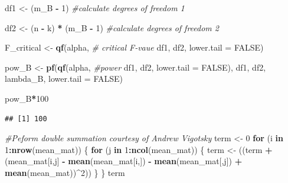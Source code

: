 \documentclass[]{book}
\newenvironment{Shaded}{\begin{snugshade}}{\end{snugshade}}
\newcommand{\CommentTok}[1]{\textcolor[rgb]{0.56,0.35,0.01}{\textit{#1}}}
\newcommand{\ControlFlowTok}[1]{\textcolor[rgb]{0.13,0.29,0.53}{\textbf{#1}}}
\newcommand{\DataTypeTok}[1]{\textcolor[rgb]{0.13,0.29,0.53}{#1}}
\newcommand{\DecValTok}[1]{\textcolor[rgb]{0.00,0.00,0.81}{#1}}
\newcommand{\KeywordTok}[1]{\textcolor[rgb]{0.13,0.29,0.53}{\textbf{#1}}}
\newcommand{\NormalTok}[1]{#1}
\newcommand{\OperatorTok}[1]{\textcolor[rgb]{0.81,0.36,0.00}{\textbf{#1}}}
\newcommand{\OtherTok}[1]{\textcolor[rgb]{0.56,0.35,0.01}{#1}}
\newcommand{\StringTok}[1]{\textcolor[rgb]{0.31,0.60,0.02}{#1}}
\begin{document}
\begin{Shaded}
\begin{Highlighting}[]
\NormalTok{df1 <-}\StringTok{ }\NormalTok{(m_B }\OperatorTok{-}\StringTok{ }\DecValTok{1}\NormalTok{) }\CommentTok{#calculate degrees of freedom 1}

\NormalTok{df2 <-}\StringTok{ }\NormalTok{(n }\OperatorTok{-}\StringTok{ }\NormalTok{k) }\OperatorTok{*}\StringTok{ }\NormalTok{(m_B }\OperatorTok{-}\StringTok{ }\DecValTok{1}\NormalTok{) }\CommentTok{#calculate degrees of freedom 2}

\NormalTok{F_critical <-}\StringTok{ }\KeywordTok{qf}\NormalTok{(alpha, }\CommentTok{# critical F-vaue}
\NormalTok{                 df1,}
\NormalTok{                 df2,}
                 \DataTypeTok{lower.tail =} \OtherTok{FALSE}\NormalTok{) }

\NormalTok{pow_B <-}\StringTok{ }\KeywordTok{pf}\NormalTok{(}\KeywordTok{qf}\NormalTok{(alpha, }\CommentTok{#power }
\NormalTok{             df1, }
\NormalTok{             df2, }
             \DataTypeTok{lower.tail =} \OtherTok{FALSE}\NormalTok{), }
\NormalTok{          df1, }
\NormalTok{          df2, }
\NormalTok{          lambda_B, }
          \DataTypeTok{lower.tail =} \OtherTok{FALSE}\NormalTok{)}


\NormalTok{pow_B}\OperatorTok{*}\DecValTok{100}
\end{Highlighting}
\end{Shaded}

\begin{verbatim}
## [1] 100
\end{verbatim}

\begin{Shaded}
\begin{Highlighting}[]
\CommentTok{#Peform double summation courtesy of Andrew Vigotsky}
\NormalTok{term <-}\StringTok{ }\DecValTok{0}
\ControlFlowTok{for}\NormalTok{ (i }\ControlFlowTok{in} \DecValTok{1}\OperatorTok{:}\KeywordTok{nrow}\NormalTok{(mean_mat)) \{}
  \ControlFlowTok{for}\NormalTok{ (j }\ControlFlowTok{in} \DecValTok{1}\OperatorTok{:}\KeywordTok{ncol}\NormalTok{(mean_mat)) \{}
\NormalTok{    term <-}\StringTok{ }\NormalTok{((term }\OperatorTok{+}\StringTok{ }\NormalTok{(mean_mat[i,j] }\OperatorTok{-}
\StringTok{                        }\KeywordTok{mean}\NormalTok{(mean_mat[i,]) }\OperatorTok{-}\StringTok{ }
\StringTok{                        }\KeywordTok{mean}\NormalTok{(mean_mat[,j]) }\OperatorTok{+}\StringTok{ }\KeywordTok{mean}\NormalTok{(mean_mat))}\OperatorTok{^}\DecValTok{2}\NormalTok{))}
\NormalTok{  \}}
\NormalTok{\}}
\NormalTok{term}
\end{Highlighting}
\end{Shaded}
\end{document}
